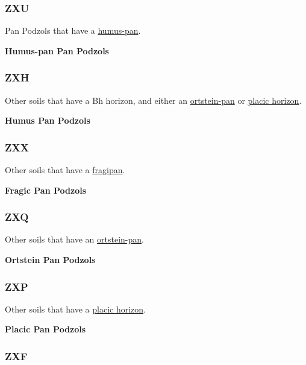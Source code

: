 \documentclass[
  letterpaper,
  DIV=11,
  numbers=noendperiod]{scrreprt}
\begin{document}
\hypertarget{sec-key-ZXU}{%
\subsubsection{\texorpdfstring{\textbf{ZXU}}{ZXU}}\label{sec-key-ZXU}}

Pan Podzols that have a \protect\hyperlink{sec-diag-hpan}{humus-pan}.

\textbf{Humus-pan Pan Podzols}

\hypertarget{sec-key-ZXH}{%
\subsubsection{\texorpdfstring{\textbf{ZXH}}{ZXH}}\label{sec-key-ZXH}}

Other soils that have a Bh horizon, and either an
\protect\hyperlink{sec-diag-opan}{ortstein-pan} or
\protect\hyperlink{sec-diag-plac}{placic horizon}.

\textbf{Humus Pan Podzols}

\hypertarget{sec-key-ZXX}{%
\subsubsection{\texorpdfstring{\textbf{ZXX}}{ZXX}}\label{sec-key-ZXX}}

Other soils that have a \protect\hyperlink{sec-diag-fpan}{fragipan}.

\textbf{Fragic Pan Podzols}

\hypertarget{sec-key-ZXQ}{%
\subsubsection{\texorpdfstring{\textbf{ZXQ}}{ZXQ}}\label{sec-key-ZXQ}}

Other soils that have an
\protect\hyperlink{sec-diag-opan}{ortstein-pan}.

\textbf{Ortstein Pan Podzols}

\hypertarget{sec-key-ZXP}{%
\subsubsection{\texorpdfstring{\textbf{ZXP}}{ZXP}}\label{sec-key-ZXP}}

Other soils that have a \protect\hyperlink{sec-diag-plac}{placic
horizon}.

\textbf{Placic Pan Podzols}

\hypertarget{sec-key-ZXF}{%
\subsubsection{\texorpdfstring{\textbf{ZXF}}{ZXF}}\label{sec-key-ZXF}}
\end{document}
